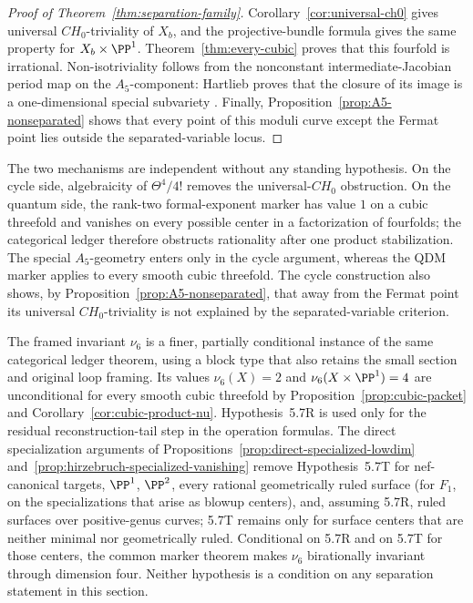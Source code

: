 \begin{proof}[Proof of Theorem~\ref{thm:separation-family}]
Corollary~\ref{cor:universal-ch0} gives universal \(CH_0\)-triviality of
\(X_b\), and the projective-bundle formula gives the same property for
\(X_b\times\PP^1\).  Theorem~\ref{thm:every-cubic} proves that this
fourfold is irrational.  Non-isotriviality follows from the nonconstant
intermediate-Jacobian period map on the \(A_5\)-component: Hartlieb proves
that the closure of its image is a one-dimensional special subvariety
\cite[Proposition~5.7]{Hartlieb}.  Finally,
Proposition~\ref{prop:A5-nonseparated} shows that every point of this moduli
curve except the Fermat point lies outside the separated-variable locus.
%
%
%
\end{proof}

The two mechanisms are independent without any standing hypothesis.  On the
cycle side, algebraicity of \(\Theta^4/4!\) removes the
universal-\(CH_0\) obstruction.  On the quantum side, the rank-two formal-exponent
marker has value \(1\) on a cubic threefold and vanishes on every possible
center in a factorization of fourfolds; the categorical ledger therefore
obstructs rationality after one product stabilization.  The special
\(A_5\)-geometry enters only in the cycle argument, whereas the QDM marker
applies to every smooth cubic threefold.  The cycle construction also shows,
by Proposition~\ref{prop:A5-nonseparated}, that away from the Fermat point its
universal \(CH_0\)-triviality is not explained by the separated-variable
criterion.

The framed invariant \(\nu_6\) is a finer, partially conditional instance of
the same categorical ledger theorem, using a block type that also retains the
small section and original loop framing.  Its values \(\nu_6(X)=2\) and
\(\nu_6(X\times\PP^1)=4\) are unconditional for every smooth cubic
threefold by Proposition~\ref{prop:cubic-packet} and
Corollary~\ref{cor:cubic-product-nu}.  Hypothesis~5.7R is used only for the
residual reconstruction-tail step in the operation formulas.  The direct
specialization arguments of Propositions~\ref{prop:direct-specialized-lowdim}
and~\ref{prop:hirzebruch-specialized-vanishing}
remove Hypothesis~5.7T for nef-canonical targets, \(\PP^1\), \(\PP^2\),
every rational geometrically ruled surface (for \(F_1\), on the
specializations that arise as blowup centers), and, assuming 5.7R, ruled
surfaces over positive-genus curves; 5.7T remains only for surface centers that
are neither minimal nor geometrically ruled.
Conditional on 5.7R and on 5.7T for those centers, the common marker theorem
makes \(\nu_6\) birationally invariant through dimension four.  Neither
hypothesis is a condition on any separation statement in this section.

